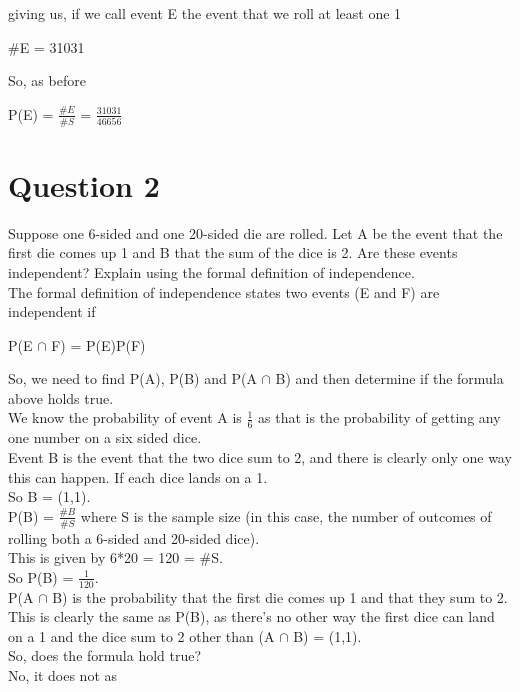 \documentclass{report}
\begin{document}
		giving us, if we call event E the event that we roll at least one 1
		
		\begin{center}
			\#E = 31031
		\end{center}

		So, as before 
		
		\begin{center}
			P(E) = $\frac{\#E}{\#S}$ = $\frac{31031}{46656}$
		\end{center}
		
		
		
		
				
	
	\section*{\hfil Question 2 \hfil}
	Suppose one 6-sided and one 20-sided die are rolled. Let A be the event that the first die comes up 1 
	and B that the sum of the dice is 2. Are these events independent? Explain using the formal definition of independence.\\

	The formal definition of independence states two events (E and F) are independent if 
		
	\begin{center}
		P(E $\cap$ F) = P(E)P(F)
	\end{center}

	So, we need to find P(A), P(B) and P(A $\cap$ B) and then determine if the formula above holds true.\\
	We know the probability of event A is $\frac{1}{6}$ as that is the probability of getting any one number on a six sided dice.\\
	Event B is the event that the two dice sum to 2, and there is clearly only one way this can happen. If each dice lands on a 1.\\
	So B = {(1,1)}.\\
	P(B) = $\frac{\#B}{\#S}$ where S is the sample size (in this case, the number of outcomes of rolling both a 6-sided and 20-sided dice).\\
	This is given by 6*20 = 120 = \#S.\\
	So P(B) = $\frac{1}{120}$.\\
	P(A $\cap$ B) is the probability that the first die comes up 1 and that they sum to 2. This is clearly the same as P(B), as there's no other way 
	the first dice can land on a 1 and the dice sum to 2 other than (A $\cap$ B) = {(1,1)}.\\
	So, does the formula hold true?\\
	No, it does not as 
\end{document}
